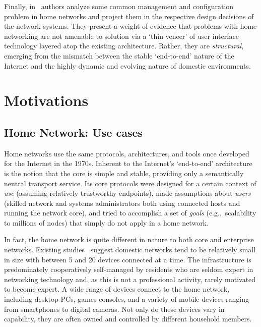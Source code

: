 Finally, in~\cite{shehan07} authors analyze some common
management and configuration problem in home networks and project them in the
respective design decisions of the network systems.  They present a weight of
evidence that problems with home networking are not amenable to solution via a
`thin veneer' of user interface technology layered atop the existing
architecture.  Rather, they are \emph{structural}, emerging from the mismatch
between the stable `end-to-end' nature of the Internet and the highly dynamic
and evolving nature of domestic environments.  



\section{Motivations}\label{s:evolution}

\subsection{Home Network: Use cases}

Home networks use the same protocols, architectures, and tools once developed for the
Internet in the 1970s.  Inherent to the Internet's `end-to-end' architecture
is the notion that the core is simple and stable, providing only a semantically
neutral transport service.  Its core protocols were designed for a certain
context of \emph{use} (assuming relatively trustworthy endpoints), made
assumptions about \emph{users} (skilled network and systems administrators both
using connected hosts and running the network core), and tried to accomplish a
set of \emph{goals} (e.g.,~scalability to millions of nodes) that simply do not
apply in a home network. 

In fact, the home network is quite different in nature to both core and
enterprise networks.  Existing studies~\cite{tolmie07,shehan07,shehanpoole08}
suggest domestic networks tend to be relatively small in size with between 5 and
20 devices connected at a time.  The infrastructure is predominately
cooperatively self-managed by residents who are seldom expert in networking
technology and, as this is not a professional activity, rarely motivated to
become expert.  A wide range of devices connect to the home network, including
desktop PCs, games consoles, and a variety of mobile devices ranging from
smartphones to digital cameras.  Not only do these devices vary in capability,
they are often owned and controlled by different household members.  

